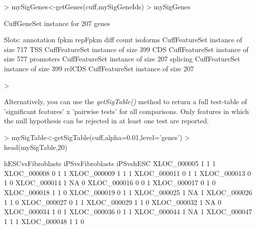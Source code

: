 \documentclass[10pt]{article}
\newcommand{\Rmethod}[1]{{\textit{#1}}}
\begin{document}
\begin{Schunk}
\begin{Sinput}
> mySigGenes<-getGenes(cuff,mySigGeneIds)
> mySigGenes
\end{Sinput}
\begin{Soutput}
CuffGeneSet instance for  207  genes
 
Slots:
	 annotation
	 fpkm
	 repFpkm
	 diff
	 count
	 isoforms	 CuffFeatureSet instance of size 717 
	 TSS		 CuffFeatureSet instance of size 399 
	 CDS		 CuffFeatureSet instance of size 577 
	 promoters		 CuffFeatureSet instance of size 207 
	 splicing		 CuffFeatureSet instance of size 399 
	 relCDS		 CuffFeatureSet instance of size 207 
\end{Soutput}
\begin{Sinput}
> 
\end{Sinput}
\end{Schunk}
Alternatively, you can use the \Rmethod{getSigTable()} method to return a full test-table of 'significant features' x 'pairwise tests' for all comparisons. Only features in which the null hypothesis can be rejected in at least one test are reported.

\begin{Schunk}
\begin{Sinput}
> mySigTable<-getSigTable(cuff,alpha=0.01,level='genes')
> head(mySigTable,20)
\end{Sinput}
\begin{Soutput}
            hESCvsFibroblasts iPSvsFibroblasts iPSvshESC
XLOC_000005                 1                1         1
XLOC_000008                 0                1         1
XLOC_000009                 1                1         1
XLOC_000011                 0                1         1
XLOC_000013                 0                1         0
XLOC_000014                 1               NA         0
XLOC_000016                 0                0         1
XLOC_000017                 0                1         0
XLOC_000018                 1                1         0
XLOC_000019                 0                1         1
XLOC_000025                 1               NA         1
XLOC_000026                 1                1         0
XLOC_000027                 0                1         1
XLOC_000029                 1                1         0
XLOC_000032                 1               NA         0
XLOC_000034                 1                0         1
XLOC_000036                 0                1         1
XLOC_000044                 1               NA         1
XLOC_000047                 1                1         1
XLOC_000048                 1                1         0
\end{Soutput}
\end{Schunk}
\end{document}
